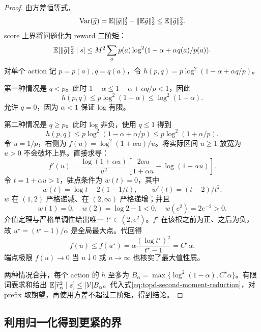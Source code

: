 \begin{proof}
由方差恒等式，
\[
 \operatorname{Var}(\widetilde g)=\mathbb{E}\|\widetilde g\|_2^2-\|\mathbb{E}\widetilde g\|_2^2
 \leq\mathbb{E}\|\widetilde g\|_2^2.
\]
score 上界将问题化为 reward 二阶矩：
\begin{equation}
 \mathbb{E}[\|\widetilde g\|_2^2\mid s]
 \leq M^2\sum_ap(a)\log^2(1-\alpha+\alpha q(a)/p(a)).
 \label{eq:topd-second-moment-reduction}
\end{equation}
对单个 action 记 $p=p(a),q=q(a)$，令 $h(p,q)=p\log^2(1-\alpha+\alpha q/p)$。

第一种情况是 $q<p$。此时 $1-\alpha\leq1-\alpha+\alpha q/p<1$，因此
\begin{equation}
 h(p,q)\leq p\log^2(1-\alpha)\leq\log^2(1-\alpha).
 \label{eq:topd-negative-case}
\end{equation}
允许 $q=0$，因为 $\alpha<1$ 保证 log 有限。

第二种情况是 $q\geq p$。此时 log 非负，使用 $q\leq1$ 得到
\[
 h(p,q)\leq p\log^2(1-\alpha+\alpha/p)\leq p\log^2(1+\alpha/p).
\]
令 $u=1/p$，右侧为 $f(u)=\log^2(1+\alpha u)/u$。将实际区间 $u\geq1$ 放宽为 $u>0$ 不会破坏上界。直接求导：
\[
 f'(u)=\frac{\log(1+\alpha u)}{u^2}
 \left[\frac{2\alpha u}{1+\alpha u}-\log(1+\alpha u)\right].
\]
令 $t=1+\alpha u>1$，驻点条件为 $w(t)=0$，其中
\[
 w(t)=\log t-2(1-1/t),\qquad w'(t)=(t-2)/t^2.
\]
$w$ 在 $(1,2)$ 严格递减、在 $(2,\infty)$ 严格递增；并且
\[
 w(1)=0,\quad w(2)=\log2-1<0,\quad w(e^2)=2e^{-2}>0.
\]
介值定理与严格单调性给出唯一 $t^\star\in(2,e^2)$。$f'$ 在该根之前为正、之后为负，故 $u^\star=(t^\star-1)/\alpha$ 是全局最大点。代回得
\begin{equation}
 f(u)\leq f(u^\star)=\alpha\frac{(\log t^\star)^2}{t^\star-1}=C^\star\alpha.
 \label{eq:topd-positive-case}
\end{equation}
端点极限 $f(u)\to0$ 当 $u\downarrow0$ 或 $u\to\infty$ 也核实了最大值性质。

两种情况合并，每个 action 的 $h$ 至多为 $B_\alpha=\max\{\log^2(1-\alpha),C^\star\alpha\}$。有限词表求和给出 $\mathbb{E}[\widetilde r_\alpha^2\mid s]\leq|\mathcal V|B_\alpha$。代入式\eqref{eq:topd-second-moment-reduction}，对 prefix 取期望，再使用方差不超过二阶矩，得到结论。
\end{proof}

\subsection{利用归一化得到更紧的界}

